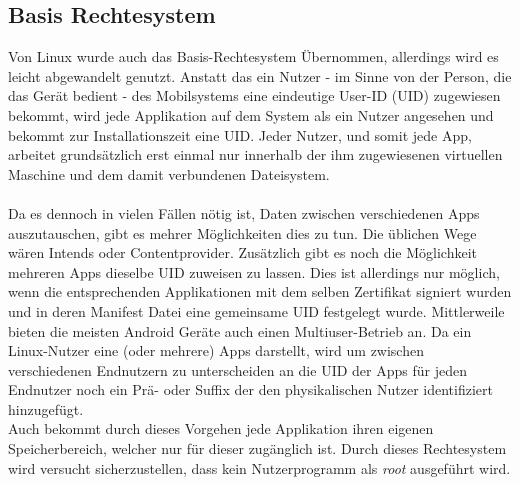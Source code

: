 	\subsection{Basis Rechtesystem}\label{sec:BasisRechteSystem}
	Von Linux wurde auch das Basis-Rechtesystem Übernommen, allerdings wird es leicht abgewandelt genutzt. Anstatt das ein Nutzer - im Sinne von der Person, die das Gerät bedient - des Mobilsystems eine eindeutige User-ID (UID) zugewiesen bekommt, wird jede Applikation auf dem System als ein Nutzer angesehen und bekommt zur Installationszeit eine UID. Jeder Nutzer, und somit jede App, arbeitet grundsätzlich erst einmal nur innerhalb der ihm zugewiesenen virtuellen Maschine und dem damit verbundenen Dateisystem.\\\\
	Da es dennoch in vielen Fällen nötig ist, Daten zwischen verschiedenen Apps auszutauschen, gibt es mehrer Möglichkeiten dies zu tun. Die üblichen Wege wären Intends oder Contentprovider. Zusätzlich gibt es noch die Möglichkeit mehreren Apps dieselbe UID zuweisen zu lassen. Dies ist allerdings nur möglich, wenn die entsprechenden Applikationen mit dem selben Zertifikat signiert wurden und in deren Manifest Datei eine gemeinsame UID festgelegt wurde.
	Mittlerweile bieten die meisten Android Geräte auch einen Multiuser-Betrieb an. Da ein Linux-Nutzer eine (oder mehrere) Apps darstellt, wird um zwischen verschiedenen Endnutzern zu unterscheiden an die UID der Apps für jeden Endnutzer noch ein Prä- oder Suffix der den physikalischen Nutzer identifiziert hinzugefügt.\\
	Auch bekommt durch dieses Vorgehen jede Applikation ihren eigenen Speicherbereich, welcher nur für dieser zugänglich ist. Durch dieses Rechtesystem wird versucht sicherzustellen, dass kein Nutzerprogramm als \textit{root} ausgeführt wird.\\
	
